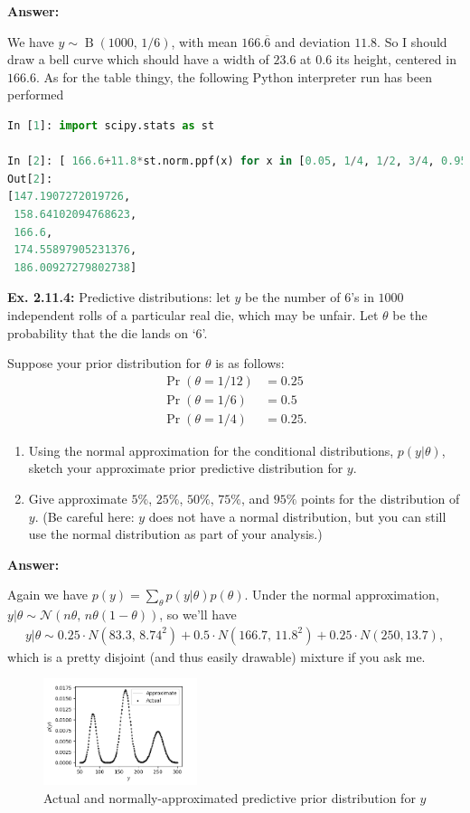\documentclass{article}
\newcommand\oname\operatorname
\begin{document}
\textbf{Answer:}

We have $y\sim\oname{B}(1000,\,1/6)$, with mean $166.\overline{6}$ and deviation $11.8$. So I should draw a bell curve which should have a width of $23.6$ at $0.6$ its height, centered in $166.6$. As for the table thingy, the following Python interpreter run has been performed
\begin{lstlisting}[language=Python]
In [1]: import scipy.stats as st

In [2]: [ 166.6+11.8*st.norm.ppf(x) for x in [0.05, 1/4, 1/2, 3/4, 0.95] ]
Out[2]:
[147.1907272019726,
 158.64102094768623,
 166.6,
 174.55897905231376,
 186.00927279802738]
\end{lstlisting}

\textbf{Ex. 2.11.4: }Predictive distributions: let $y$ be the number of $6$'s in $1000$ independent rolls of a particular real die, which may be unfair. Let $\theta$ be the probability that the die lands on `$6$'.

Suppose your prior distribution for $\theta$ is as follows:
\begin{align*}
	\oname{Pr}(\theta=1/12)&=0.25\\
	\oname{Pr}(\theta=1/6)&=0.5\\
	\oname{Pr}(\theta=1/4)&=0.25.
\end{align*}

\begin{enumerate}[label=\alph*]
	\item Using the normal approximation for the conditional distributions, $p(y|\theta)$, sketch your approximate prior predictive distribution for $y$.
	\item Give approximate $5\%$, $25\%$, $50\%$, $75\%$, and $95\%$ points for the distribution of $y$. (Be careful here: $y$ does not have a normal distribution, but you can still use the normal distribution as part of your analysis.)
\end{enumerate}

\textbf{Answer:}

Again we have $p(y)=\sum_\theta p(y|\theta)p(\theta)$. Under the normal approximation, $y|\theta\sim\mathcal N(n\theta,\,n\theta(1-\theta))$, so we'll have
\begin{align*}
	y|\theta\sim 0.25\cdot N(83.3,\,8.74^2)+0.5\cdot N(166.7,\,11.8^2)+0.25\cdot N(250, 13.7),
\end{align*}
which is a pretty disjoint (and thus easily drawable) mixture if you ask me.
\begin{figure}[h]
	\center
	\includegraphics[width=0.4\textwidth]{Numerical/2.11.4.png}
	\caption{Actual and normally-approximated predictive prior distribution for $y$}
	\label{fig:2.11.4}
\end{figure}
\end{document}
